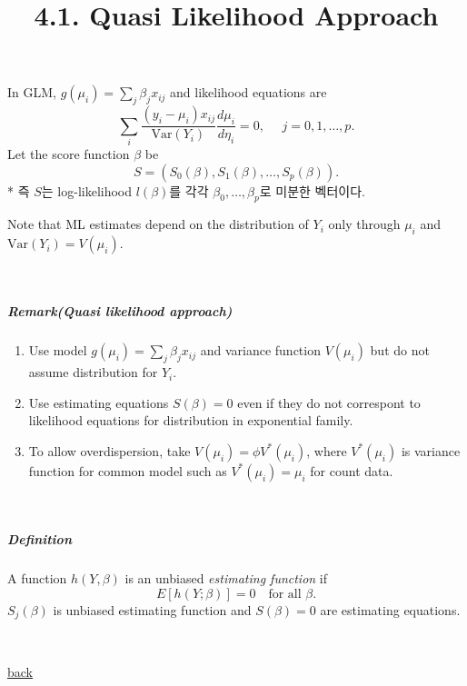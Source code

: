 \documentclass[]{article}
\title{4.1. Quasi Likelihood Approach}
\author{}
\date{\vspace{-2.5em}}
\let\oldsubparagraph\subparagraph
\renewcommand{\subparagraph}[1]{\oldsubparagraph{#1}\mbox{}}
\begin{document}
\maketitle

In GLM, \(g(\mu_i)=\sum_j \beta_jx_{ij}\) and likelihood equations are
\[
\sum_i \frac{(y_i-\mu_i)x_{ij}}{\text{Var}(Y_i)}\frac{d\mu_i}{d\eta_i}=0,\mbox{ }\mbox{ } j=0,1,\ldots,p.
\] Let the score function \(\beta\) be \[
S=(S_0(\beta), S_1(\beta),\ldots,S_p(\beta)).
\] * 즉 \(S\)는 log-likelihood \(l(\beta)\)를 각각
\(\beta_0,\ldots,\beta_p\)로 미분한 벡터이다.

Note that ML estimates depend on the distribution of \(Y_i\) only
through \(\mu_i\) and \(\text{Var}(Y_i)=V(\mu_i)\).

~~

\hypertarget{remarkquasi-likelihood-approach}{%
\subparagraph{Remark(Quasi likelihood
approach)}\label{remarkquasi-likelihood-approach}}

\begin{enumerate}
\def\labelenumi{\arabic{enumi}.}
\item
  Use model \(g(\mu_i)=\sum_j \beta_jx_{ij}\) and variance function
  \(V(\mu_i)\) but do not assume distribution for \(Y_i\).
\item
  Use estimating equations \(S(\beta)=0\) even if they do not correspont
  to likelihood equations for distribution in exponential family.
\item
  To allow overdispersion, take \(V(\mu_i)=\phi V^*(\mu_i)\), where
  \(V^*(\mu_i)\) is variance function for common model such as
  \(V^*(\mu_i)=\mu_i\) for count data.
\end{enumerate}

~~

\hypertarget{definition}{%
\subparagraph{Definition}\label{definition}}

A function \(h(Y,\beta)\) is an unbiased \emph{estimating function} if
\[
E[h(Y;\beta)]=0 \mbox{ }\mbox{ for all }\beta.
\] \(S_j(\beta)\) is unbiased estimating function and \(S(\beta)=0\) are
estimating equations.

~~

\href{../glm.html}{back}
\end{document}
